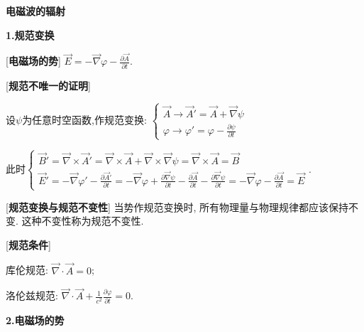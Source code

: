 


 \begin{center} 
 \Large \textbf{电磁波的辐射}
\end{center}
 
\large 
\begin{center}
 \textbf{1.规范变换}
\end{center}

[\textbf{电磁场的势}] $\vec E=-\vec\nabla\varphi - \frac{\partial\vec A}{\partial t}$.\par

[\textbf{规范不唯一的证明}]\par
\qquad 设$\psi$为任意时空函数,作规范变换: $\begin{cases}\vec A\rightarrow\vec A' = \vec A+\vec\nabla\psi\\\varphi\rightarrow\varphi'=\varphi - \frac{\partial \psi}{\partial t}\end{cases}$\par
\qquad 此时$\begin{cases}\vec B'=\vec\nabla\times\vec A'=\vec\nabla\times\vec A+\vec\nabla\times\vec\nabla\psi=\vec\nabla\times\vec A=\vec B\\\vec E'=-\vec\nabla\varphi'-\frac{\partial \vec A'}{\partial t}=-\vec\nabla\varphi+\frac{\partial \vec\nabla\psi}{\partial t}-\frac{\partial\vec A}{\partial t}-\frac{\partial \vec\nabla\psi}{\partial t}=-\vec\nabla\varphi-\frac{\partial\vec A}{\partial t}=\vec E\end{cases}$.\par

[\textbf{规范变换与规范不变性}] 当势作规范变换时, 所有物理量与物理规律都应该保持不变. 这种不变性称为规范不变性.\par

[\textbf{规范条件}]\par
\qquad 库伦规范: $\vec\nabla\cdot\vec A=0$;\par
\qquad 洛伦兹规范: $\vec\nabla\cdot\vec A+\frac{1}{c^2}\frac{\partial\varphi}{\partial t}=0$.\par

\begin{center}
 \textbf{2.电磁场的势}
\end{center}

